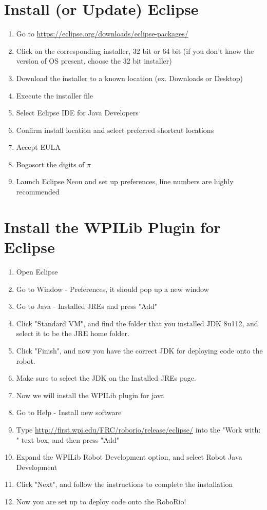 \documentclass[11pt,fleqn]{article}
\begin{document}
\section*{Install (or Update) Eclipse}
\begin{enumerate}
\item Go to \url{https://eclipse.org/downloads/eclipse-packages/}
\item Click on the corresponding installer, 32 bit or 64 bit (if you don't know the version of OS present, choose the 32 bit installer)
\item Download the installer to a known location (ex. Downloads or Desktop)
\item Execute the installer file
\item Select Eclipse IDE for Java Developers
\item Confirm install location and select preferred shortcut locations
\item Accept EULA
\item Bogosort the digits of $\pi$
\item Launch Eclipse Neon and set up preferences, line numbers are highly recommended
\end{enumerate}

\section*{Install the WPILib Plugin for Eclipse}
\begin{enumerate}
\item Open Eclipse
\item Go to Window - Preferences, it should pop up a new window
\item Go to Java - Installed JREs and press "Add"
\item Click "Standard VM", and find the folder that you installed JDK 8u112, and select it to be the JRE home folder.
\item Click "Finish", and now you have the correct JDK for deploying code onto the robot.
\item Make sure to select the JDK on the Installed JREs page.
\item Now we will install the WPILib plugin for java
\item Go to Help - Install new software
\item Type \url{http://first.wpi.edu/FRC/roborio/release/eclipse/} into the "Work with: " text box, and then press "Add"
\item Expand the WPILib Robot Development option, and select Robot Java Development
\item Click "Next", and follow the instructions to complete the installation
\item Now you are set up to deploy code onto the RoboRio!
\end{enumerate}	
\end{document}
